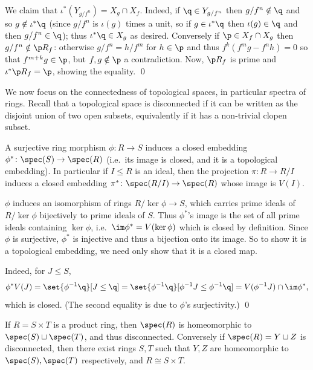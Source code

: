     We claim that $\iota^*(Y_{g/f^n})=X_g\cap X_f$.
    Indeed, if $\q\in Y_{g/f^n}$ then $g/f^n\notin\q$ and so $g\notin\iota^*\q$ (since $g/f^n$ is $\iota(g)$ times a unit, so if $g\in\iota^*\q$ then $\iota(g)\in\q$
    and then $g/f^n\in\q$); thus $\iota^*\q\in X_g$ as desired.
    Conversely if $\p\in X_f\cap X_g$ then $g/f^n\notin \p R_f$: otherwise $g/f^n=h/f^m$ for $h\in\p$ and thus $f^k(f^mg-f^nh)=0$ so that $f^{m+k}g\in\p$, but $f,g\notin\p$
    a contradiction.
    Now, $\p R_f$ is prime and $\iota^*\p R_f=\p$, showing the equality.
    \qed

\eproof

We now focus on the connectedness of topological spaces, in particular spectra of rings.
Recall that a topological space is {\emphcolor disconnected} if it can be written as the disjoint union of two open subsets, equivalently if it has a non-trivial clopen subset.

\blemm

    A surjective ring morphism $\phi\colon R\to S$ induces a closed embedding $\phi^*\colon\spec(S)\to\spec(R)$ (i.e.\ its image is closed, and it is a topological embedding).
    In particular if $I\leq R$ is an ideal, then the projection $\pi\colon R\to R/I$ induces a closed embedding $\pi^*\colon\spec(R/I)\to\spec(R)$ whose image is $V(I)$.

\elemm

\bproof

    $\phi$ induces an isomorphism of rings $R/\ker\phi\to S$, which carries prime ideals of $R/\ker\phi$ bijectively to prime ideals of $S$.
    Thus $\phi^*$'s image is the set of all prime ideals containing $\ker\phi$, i.e.\ $\im\phi^*=V(\ker\phi)$ which is closed by definition.
    Since $\phi$ is surjective, $\phi^*$ is injective and thus a bijection onto its image.
    So to show it is a topological embedding, we need only show that it is a closed map.

    Indeed, for $J\leq S$,
    $$ \phi^*V(J) = \set{\phi^{-1}\q}[J\leq\q] = \set{\phi^{-1}\q}[\phi^{-1}J\leq\phi^{-1}\q] = V(\phi^{-1}J)\cap\im\phi^* , $$
    which is closed.
    (The second equality is due to $\phi$'s surjectivity.)
    \qed

\eproof

\bprop

    If $R=S\times T$ is a product ring, then $\spec(R)$ is homeomorphic to $\spec(S)\sqcup\spec(T)$, and thus disconnected.
    Conversely if $\spec(R)=Y\sqcup Z$ is disconnected, then there exist rings $S,T$ such that $Y,Z$ are homeomorphic to $\spec(S),\spec(T)$ respectively, and $R\cong S\times T$.

